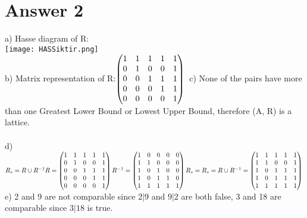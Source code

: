 \documentclass[12pt]{article}
\begin{document}
\section*{Answer 2}
a) Hasse diagram of R:\\\texttt{[image: HASSiktir.png]}\\
b) Matrix representation of R:$\begin{pmatrix}
1 & 1 & 1 & 1 & 1\\
0 & 1 & 0 & 0 & 1\\
0 & 0 & 1 & 1 & 1\\
0 & 0 & 0 & 1 & 1\\
0 & 0 & 0 & 0 & 1
\end{pmatrix}\\\\\\$
c) None of the pairs have more than one Greatest Lower Bound or Lowest Upper Bound, therefore (A, R) is a lattice.\\\\
d) $R_s=R \cup R^{-1}\\\\
R = \begin{pmatrix}
1 & 1 & 1 & 1 & 1\\
0 & 1 & 0 & 0 & 1\\
0 & 0 & 1 & 1 & 1\\
0 & 0 & 0 & 1 & 1\\
0 & 0 & 0 & 0 & 1
\end{pmatrix}\\\\\\
R^{-1}=\begin{pmatrix}
1 & 0 & 0 & 0 & 0\\
1 & 1 & 0 & 0 & 0\\
1 & 0 & 1 & 0 & 0\\
1 & 0 & 1 & 1 & 0\\
1 & 1 & 1 & 1 & 1
\end{pmatrix}\\\\\\
R_s=R_s=R \cup R^{-1}=\begin{pmatrix}
1 & 1 & 1 & 1 & 1\\
1 & 1 & 0 & 0 & 1\\
1 & 0 & 1 & 1 & 1\\
1 & 0 & 1 & 1 & 1\\
1 & 1 & 1 & 1 & 1
\end{pmatrix}\\\\\\$
e) 2 and 9 are not comparable since $2|9$ and $9|2$ are both false, 3 and 18 are comparable since $3|18$ is true.
\end{document}
